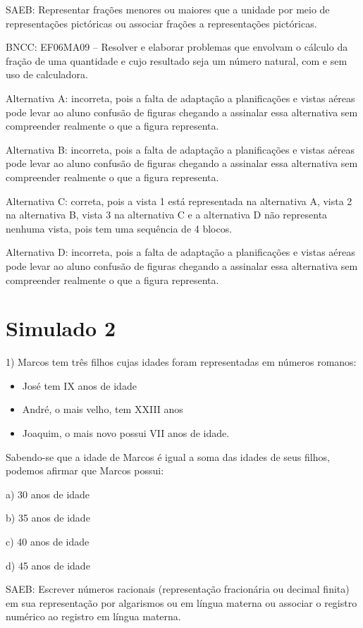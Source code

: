 SAEB: Representar frações menores ou maiores que a unidade por meio de
representações pictóricas ou associar frações a representações
pictóricas.

BNCC: EF06MA09 -- Resolver e elaborar problemas que envolvam o cálculo
da fração de uma quantidade e cujo resultado seja um número natural, com
e sem uso de calculadora.

Alternativa A: incorreta, pois a falta de adaptação a planificações e
vistas aéreas pode levar ao aluno confusão de figuras chegando a
assinalar essa alternativa sem compreender realmente o que a figura
representa.

Alternativa B: incorreta, pois a falta de adaptação a planificações e
vistas aéreas pode levar ao aluno confusão de figuras chegando a
assinalar essa alternativa sem compreender realmente o que a figura
representa.

Alternativa C: correta, pois a vista 1 está representada na alternativa
A, vista 2 na alternativa B, vista 3 na alternativa C e a alternativa D
não representa nenhuma vista, pois tem uma sequência de 4 blocos.

Alternativa D: incorreta, pois a falta de adaptação a planificações e
vistas aéreas pode levar ao aluno confusão de figuras chegando a
assinalar essa alternativa sem compreender realmente o que a figura
representa.

\chapter{Simulado 2}

1) Marcos tem três filhos cujas idades foram representadas em números
romanos:

\begin{itemize}
\item
  José tem IX anos de idade
\item
  André, o mais velho, tem XXIII anos
\item
  Joaquim, o mais novo possui VII anos de idade.
\end{itemize}

Sabendo-se que a idade de Marcos é igual a soma das idades de seus
filhos, podemos afirmar que Marcos possui:

a) 30 anos de idade

b) 35 anos de idade

c) 40 anos de idade

d) 45 anos de idade

SAEB: Escrever números racionais (representação fracionária ou decimal
finita) em sua representação por algarismos ou em língua materna ou
associar o registro numérico ao registro em língua materna.

